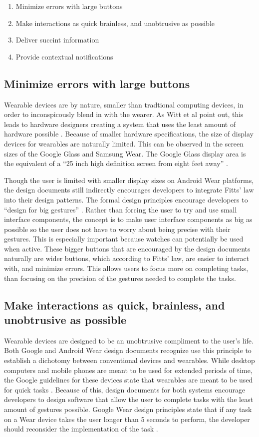 \documentclass[12pt]{article}
\begin{document}
\begin{enumerate}
\item{Minimize errors with large buttons}
\item{Make interactions as quick brainless, and unobtrusive as possible}
\item{Deliver succint information}
\item{Provide contextual notifications}
\end{enumerate}

\subsection{Minimize errors with large buttons}
Wearable devices are by nature, smaller than tradtional computing devices, in order to inconspicously blend in with the wearer. As Witt et al point out, this leads to hardware designers creating a system that uses the least amount of hardware possible \cite{witt}. Because of smaller hardware specifications, the size of display devices for wearables are naturally limited. This can be observed in the screen sizes of the Google Glass and Samsung Wear. The Google Glass display area is the equivalent of a ``25 inch high definition screen from eight feet away'' \cite{goog2}.

Though the user is limited with smaller display sizes on Android Wear platforms, the design documents still indirectly encourages developers to integrate Fitts' law into their design patterns. The formal design principles encourage developers to ``design for big gestures'' \cite{andr}. Rather than forcing the user to try and use small interface components, the concept is to make user interface components as big as possible so the user does not have to worry about being precise with their gestures. This is especially important because watches can potentially be used when active. These bigger buttons that are encouraged by the design documents naturally are wider buttons, which according to Fitts' law, are easier to interact with, and minimize errors. This allows users to focus more on completing tasks, than focusing on the precision of the gestures needed to complete the tasks.

\subsection{Make interactions as quick, brainless, and unobtrusive as possible}
Wearable devices are designed to be an unobtrusive compliment to the user's life. Both Google and Android Wear design documents recognize use this principle to establish a dichotomy between conventional devices and wearables. While desktop computers and mobile phones are meant to be used for extended periods of time, the Google guidelines for these devices state that wearables are meant to be used for quick tasks \cite{andr} \cite{goog}. Because of this, design documents for both systems encourage developers to design software that allow the user to complete tasks with the least amount of gestures possible. Google Wear design principles state that if any task on a Wear device takes the user longer than 5 seconds to perform, the developer should reconsider the implementation of the task \cite{andr}. 
\end{document}
